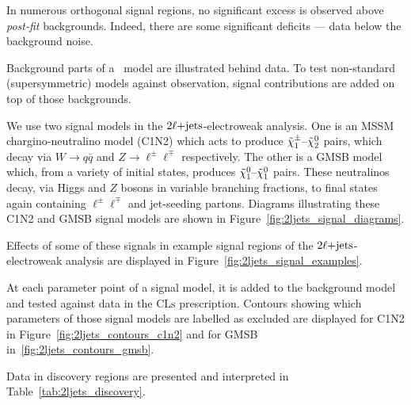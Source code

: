 In numerous orthogonal signal regions, no significant excess is observed
above \emph{post-fit} backgrounds.
Indeed, there are some significant deficits --- data below the background noise.

Background parts of a \heplikelihood\ model are illustrated behind data.
To test non-standard (supersymmetric) models against observation, signal
contributions are added on top of those backgrounds.

We use two signal models in the $2\ell\mathrm{+jets}$-electroweak analysis.
One is an MSSM chargino-neutralino model (C1N2) which acts to produce
$\tilde\chi^\pm_1\textrm{--}\tilde\chi^0_2$ pairs, which decay via
$W\rightarrow q\bar q$ and
$Z\rightarrow \ell^\pm \ell^\mp$ respectively.
The other is a GMSB model which, from a variety of initial states, produces
$\tilde\chi^0_1\textrm{--}\tilde\chi^0_1$ pairs.
These neutralinos decay,
via Higgs and $Z$ bosons in variable branching fractions,
to final states again containing $\ell^\pm \ell^\mp$ and jet-seeding partons.
Diagrams illustrating these C1N2 and GMSB signal models are shown in
Figure~\ref{fig:2ljets_signal_diagrams}.

Effects of some of these signals in example signal regions of the
$2\ell\mathrm{+jets}$-electroweak analysis are displayed in
Figure~\ref{fig:2ljets_signal_examples}.

At each parameter point of a signal model, it is added to the background model
and tested against data in the $\mathrm{CLs}$ prescription.
Contours showing which parameters of those signal models are labelled as
excluded are displayed for
C1N2 in Figure~\ref{fig:2ljets_contours_c1n2} and for
GMSB in~\ref{fig:2ljets_contours_gmsb}.

Data in discovery regions are presented and interpreted in
Table~\ref{tab:2ljets_discovery}.


